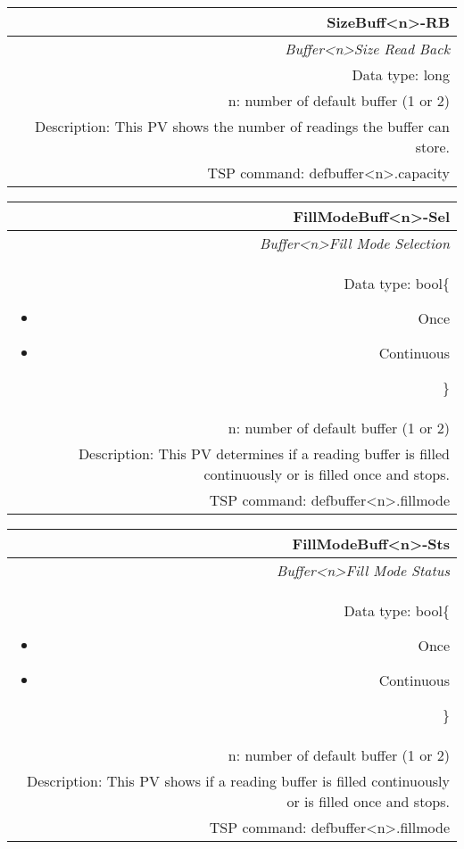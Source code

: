 \documentclass[openany]{article}
\begin{document}
		\begin{tabular}{N}
			\hline
			\bfseries SizeBuff\textless n\textgreater-RB\label{pv:sizebuff-rb} \\ \hline
			\emph{Buffer\textless n\textgreater Size Read Back} \\
			Data type: long \\
			n: number of default buffer (1 or 2) \\
			Description: This PV shows the number of readings the buffer can store. \\
			TSP command: defbuffer\textless n\textgreater.capacity
		\end{tabular}

		\begin{tabular}{N}
			\hline
			\bfseries FillModeBuff\textless n\textgreater-Sel\label{pv:fillmodebuff-sel} \\ \hline
			\emph{Buffer\textless n\textgreater Fill Mode Selection} \\
			Data type: bool\{\begin{itemize}[noitemsep]
				\small
				\item[] Once
				\item[] Continuous
			\end{itemize}\} \\
			n: number of default buffer (1 or 2) \\
			Description: This PV determines if a reading buffer is filled continuously or is filled once and stops. \\
			TSP command: defbuffer\textless n\textgreater.fillmode
		\end{tabular}

		\begin{tabular}{N}
			\hline
			\bfseries FillModeBuff\textless n\textgreater-Sts\label{pv:fillmodebuff-sts} \\ \hline
			\emph{Buffer\textless n\textgreater Fill Mode Status} \\
			Data type: bool\{\begin{itemize}[noitemsep]
				\small
				\item[] Once
				\item[] Continuous
			\end{itemize}\} \\
			n: number of default buffer (1 or 2) \\
			Description: This PV shows if a reading buffer is filled continuously or is filled once and stops. \\
			TSP command: defbuffer\textless n\textgreater.fillmode
		\end{tabular}
\end{document}
